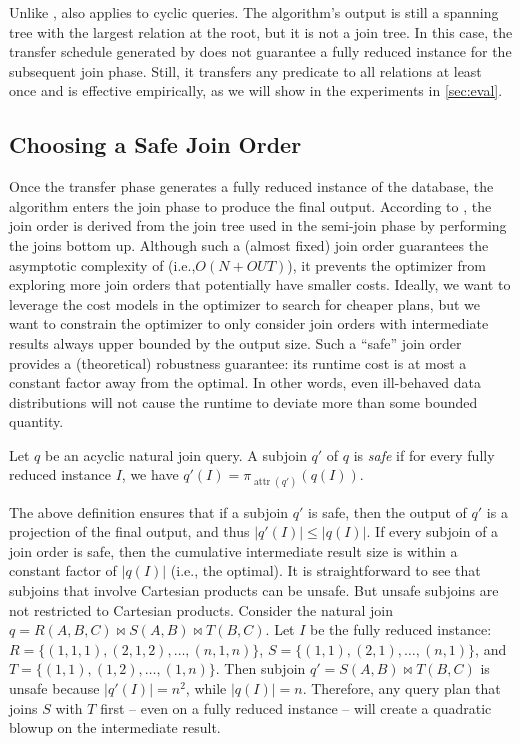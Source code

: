 Unlike \YannAlg, \TreeStruct also applies to cyclic queries. The algorithm's output is still a spanning tree with the largest relation at the root, but it is not a join tree. In this case, the transfer schedule generated by \TreeStruct does not guarantee a fully reduced instance for the subsequent join phase. Still, it transfers any predicate to all relations at least once and is effective empirically, as we will show in the experiments in \cref{sec:eval}.




\subsection{Choosing a Safe Join Order}
\label{sec:modeling:join}

Once the transfer phase generates a fully reduced instance of the database, the algorithm enters the join phase to produce the final output. According to \YannAlg, the join order is derived from the join tree used in the semi-join phase by performing the joins bottom up. Although such a (almost fixed) join order guarantees the asymptotic complexity of \YannAlg (i.e.,$O(N + OUT)$), it prevents the optimizer from exploring more join orders that potentially have smaller costs. Ideally, we want to leverage the cost models in the optimizer to search for cheaper plans, but we want to constrain the optimizer to only consider join orders with intermediate results always upper bounded by the output size. Such a ``safe'' join order provides a (theoretical) robustness guarantee: its runtime cost is at most a constant factor away from the optimal. In other words, even ill-behaved data distributions will not cause the runtime to deviate more than some bounded quantity.

\begin{definition}\label{def:safe}
Let $q$ be an acyclic natural join query. A subjoin $q'$ of $q$ is {\em safe} if for every fully reduced instance $I$, we have $q'(I) = \pi_{\operatorname{attr}(q')}(q(I))$.
\end{definition}

The above definition ensures that if a subjoin $q'$ is safe, then the output of $q'$ is a projection of the final output, and thus $|q'(I)| \leq |q(I)|$. If every subjoin of a join order is safe, then the cumulative intermediate result size is within a constant factor of $|q(I)|$ (i.e., the optimal). It is straightforward to see that subjoins that involve Cartesian products can be unsafe. But unsafe subjoins are not restricted to Cartesian products. Consider the natural join $q = R(A,B,C) \Join S(A,B) \Join T(B,C)$. Let $I$ be the fully reduced instance:
$R = \{(1,1,1), (2,1,2), \dots, (n,1,n)\}$, $S = \{(1,1),(2,1), \dots, (n,1)\}$, and $T = \{(1,1),(1,2), \dots, (1,n)\}$.
Then subjoin $q' = S(A,B) \Join T(B,C)$ is unsafe because $|q'(I)| = n^2$, while $|q(I)| = n$. Therefore, any query plan that joins $S$ with $T$ first -- even on a fully reduced instance -- will create a quadratic blowup on the intermediate result.

